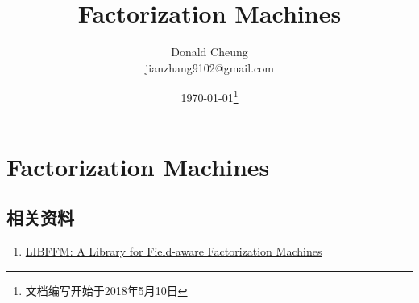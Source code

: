 \ifx\mlnotes\undefined
    \providecommand{\notesroot}{../..}
    \providecommand{\fmroot}{.}

    \title{Factorization Machines}
    \author{Donald Cheung\\jianzhang9102@gmail.com}
    \date{\today\footnote{文档编写开始于2018年5月10日}}

    
\else
    \providecommand{\fmroot}{\mlroot/fm}
\fi

\chapter{Factorization Machines}


\section{相关资料}

\begin{enumerate}
    \item \href{https://www.csie.ntu.edu.tw/~r01922136/libffm/}{LIBFFM: A Library for Field-aware Factorization Machines}
\end{enumerate}

\ifx\mlnotes\undefined
    
\fi
